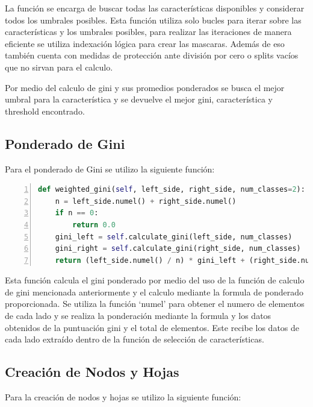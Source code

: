 \documentclass[12pt,a4paper]{article}
\begin{document}
La función se encarga de buscar todas las características disponibles y considerar todos los umbrales posibles.
Esta función utiliza solo bucles para iterar sobre las características y los umbrales posibles,
para realizar las iteraciones de manera eficiente se utiliza indexación lógica para crear las mascaras.
Además de eso también cuenta con medidas de protección ante división por cero o splits vacíos que no sirvan para el calculo.

Por medio del calculo de gini y sus promedios ponderados se busca el mejor umbral para la característica y se devuelve el mejor gini, característica y threshold encontrado.

\subsection{Ponderado de Gini}\label{subsec:ponderado-de-gini}

Para el ponderado de Gini se utilizo la siguiente función:

\begin{lstlisting}[language=Python, numbers=left, basicstyle=\ttfamily\tiny,label={lst:lstlisting4}]
def weighted_gini(self, left_side, right_side, num_classes=2):
    n = left_side.numel() + right_side.numel()
    if n == 0:
        return 0.0
    gini_left = self.calculate_gini(left_side, num_classes)
    gini_right = self.calculate_gini(right_side, num_classes)
    return (left_side.numel() / n) * gini_left + (right_side.numel() / n) * gini_right
\end{lstlisting}

Esta función calcula el gini ponderado por medio del uso de la función de calculo de gini mencionada anteriormente y el calculo mediante la formula
de ponderado proporcionada.
Se utiliza la función `numel' para obtener el numero de elementos de cada lado y se realiza la ponderación mediante la formula y los
datos obtenidos de la puntuación gini y el total de elementos.
Este recibe los datos de cada lado extraído dentro de la función de selección de características.

\subsection{Creación de Nodos y Hojas}\label{subsec:creacion-de-nodos-y-hojas}

Para la creación de nodos y hojas se utilizo la siguiente función:
\end{document}
